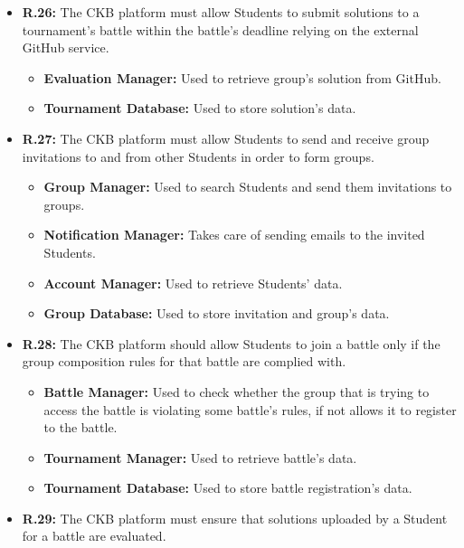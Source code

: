 \documentclass{article}
\begin{document}
{\begin{itemize}
\begin{itemize}
          \end{itemize}
    \item \textbf{R.26:} The CKB platform must allow Students to submit solutions to a tournament's battle
        within the battle's deadline relying on the external GitHub service.
          \begin{itemize}
              \item \textbf{Evaluation Manager:} Used to retrieve group's solution from GitHub.
              \item \textbf{Tournament Database:} Used to store solution's data.
          \end{itemize}
    \item \textbf{R.27:} The CKB platform must allow Students to send and receive group invitations to and from
          other Students in order to form groups.
          \begin{itemize}
              \item \textbf{Group Manager:} Used to search Students and send them invitations to groups.
              \item \textbf{Notification Manager:} Takes care of sending emails to the invited Students.
              \item \textbf{Account Manager:} Used to retrieve Students' data.
              \item \textbf{Group Database:} Used to store invitation and group's data.
          \end{itemize}
    \item \textbf{R.28:} The CKB platform should allow Students to join a battle only if the group composition rules
          for that battle are complied with.
          \begin{itemize}
              \item \textbf{Battle Manager:} Used to check whether the group that is trying to
              access the battle is violating some battle's rules, if not allows it to register to
              the battle.
              \item \textbf{Tournament Manager:} Used to retrieve battle's data.
              \item \textbf{Tournament Database:} Used to store battle registration's data.
          \end{itemize}
    \item \textbf{R.29:} The CKB platform must ensure that solutions uploaded by a Student for a battle are evaluated.
          \begin{itemize}

\end{itemize}
\end{itemize}}
\end{document}
